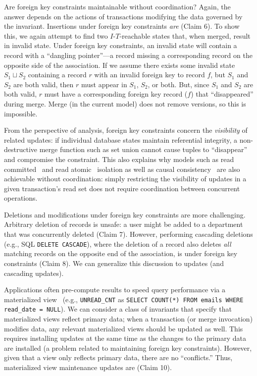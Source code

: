 Are foreign key constraints maintainable without coordination? Again,
the answer depends on the actions of transactions modifying the data
governed by the invariant. Insertions under foreign key constraints
\textit{are} \iconfluent (Claim 6). To show this, we again attempt to find two
$I$-$T$-reachable states that, when merged, result in invalid
state. Under foreign key constraints, an invalid state will contain a
record with a ``dangling pointer''---a record missing a corresponding
record on the opposite side of the association. If we assume there
exists some invalid state $S_1 \sqcup S_2$ containing a record $r$
with an invalid foreign key to record $f$, but $S_1$ and $S_2$ are
both valid, then $r$ must appear in $S_1$, $S_2$, or both. But, since
$S_1$ and $S_2$ are both valid, $r$ must have a corresponding foreign
key record ($f$) that ``disappeared'' during merge. Merge (in the
current model) does not remove versions, so this is impossible.

From the perspective of \iconfluence analysis, foreign key constraints
concern the \textit{visibility} of related updates: if individual
database states maintain referential integrity, a non-destructive
merge function such as set union cannot cause tuples to ``disappear''
and compromise the constraint. This also explains why models such as
read committed~\cite{adya-isolation} and read
atomic~\cite{adya-isolation} isolation as well as causal
consistency~\cite{hat-vldb} are also achievable without coordination:
simply restricting the visibility of updates in a given transaction's
read set does not require coordination between concurrent operations.

Deletions and modifications under foreign key constraints are more
challenging. Arbitrary deletion of records is unsafe: a user might be
added to a department that was concurrently deleted (Claim
7). However, performing cascading deletions (e.g., SQL \texttt{DELETE
  CASCADE}), where the deletion of a record also deletes \textit{all}
matching records on the opposite end of the association, is
\iconfluent under foreign key constraints (Claim 8). We can generalize
this discussion to updates (and cascading updates).

 Applications often pre-compute results
to speed query performance via a materialized view~\cite{tamer-book}
(e.g., \texttt{UNREAD\_CNT} as \texttt{SELECT}\texttt{
}\texttt{COUNT(*)}\texttt{ }\texttt{FROM}\texttt{
}\texttt{emails}\texttt{ }\texttt{WHERE}\texttt{ }\texttt{read\_date =
  NULL}). We can consider a class of invariants that specify that
materialized views reflect primary data; when a transaction (or merge
invocation) modifies data, any relevant materialized views should be
updated as well. This requires installing updates at the same time as
the changes to the primary data are installed (a problem related to
maintaining foreign key constraints). However, given that a view
only reflects primary data, there are no ``conflicts.'' Thus,
materialized view maintenance updates are \iconfluent (Claim 10).

